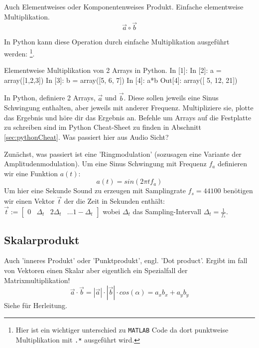 Auch Elementweises oder Komponentenweises Produkt. Einfache elementweise Multiplikation.
$$ \vec{a}\circ \vec{b}$$

In Python kann diese Operation durch einfache Multiplikation ausgeführt werden: \footnote{Hier ist ein wichtiger unterschied zu \texttt{MATLAB} Code da dort punktweise Multiplikation mit \texttt{.*} ausgeführt wird.}.

\begin{python}{Elementweise Multiplikation von 2 Arrays in Python.}
In [1]: %
In [2]: a = array([1,2,3])
In [3]: b = array([5, 6, 7])
In [4]: a*b
Out[4]: array([ 5, 12, 21])
\end{python}

\begin{question}
In Python, definiere 2 Arrays, $\vec{a}$ und $\vec{b}$. Diese sollen jeweils eine Sinus Schwingung enthalten, aber jeweils mit anderer Frequenz. Multipliziere sie, plotte das Ergebnis und höre dir das Ergebnis an. Befehle um Arrays auf die Festplatte zu schreiben sind im Python Cheat-Sheet zu finden in Abschnitt \ref{sec:pythonCheat}. Was passiert hier aus Audio Sicht?
\end{question}

\begin{answer}
Zunächst, was passiert ist eine 'Ringmodulation' (sozusagen eine Variante der Amplitudenmodulation). Um eine Sinus Schwingung mit Frequenz $f_a$ definieren wir eine Funktion $a(t)$:
\begin{equation}
a(t) = sin(2 \pi t f_a)
\end{equation}
Um hier eine Sekunde Sound zu erzeugen mit Samplingrate $f_s = 44100$ benötigen wir einen Vektor $\vec{t}$ der die Zeit in Sekunden enthält: $\vec{t}:= \begin{bmatrix} 0 & \Delta_t& 2 \Delta_t &  \dots 1-\Delta_t \end{bmatrix}$ wobei $\Delta_t$ das Sampling-Intervall $\Delta_t = \frac{1}{f_s}$.

\end{answer}

\subsection*{Skalarprodukt}

Auch 'inneres Produkt' oder 'Punktprodukt', engl. 'Dot product'. Ergibt im fall von Vektoren einen Skalar aber eigentlich ein Spezialfall der Matrixmultiplikation!
$$\vec{a}\cdot \vec{b} = |\vec{a}|\cdot |\vec{b}|\cdot cos(\alpha) = a_x b_x + a_y b_y$$
Siehe \citep[p.~45]{Westermmann2008}  für Herleitung.

